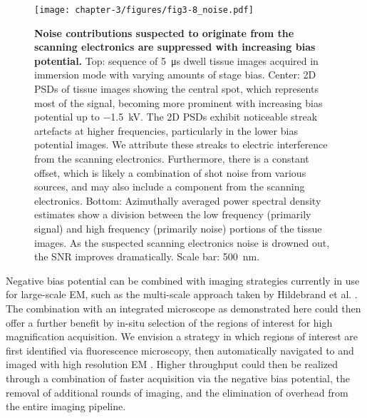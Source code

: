 \begin{figure}[!tbh]
    \centering
    \texttt{[image: chapter-3/figures/fig3-8\_noise.pdf]}
    \caption{\textbf{Noise contributions suspected to originate from the scanning electronics are suppressed with increasing bias potential.}
    Top: sequence of \SI{5}{\micro\second} dwell tissue images acquired in immersion mode with varying amounts of stage bias. Center: 2D PSDs of tissue images showing the central spot, which represents most of the signal, becoming more prominent with increasing bias potential up to \SI{-1.5}{\kilo\volt}. The 2D PSDs exhibit noticeable streak artefacts at higher frequencies, particularly in the lower bias potential images. We attribute these streaks to electric interference from the scanning electronics. Furthermore, there is a constant offset, which is likely a combination of shot noise from various sources, and may also include a component from the scanning electronics. Bottom: Azimuthally averaged power spectral density estimates show a division between the low frequency (primarily signal) and high frequency (primarily noise) portions of the tissue images. As the suspected scanning electronics noise is drowned out, the SNR improves dramatically. Scale bar: \SI{500}{\nano\meter}.}
    \label{fig:3.8_noise}
\end{figure}

Negative bias potential can be combined with imaging strategies currently in use for large-scale EM, such as the multi-scale approach taken by Hildebrand et al. \cite{hildebrand2017whole}. The combination with an integrated microscope as demonstrated here could then offer a further benefit by in-situ selection of the regions of interest for high magnification acquisition. We envision a strategy in which regions of interest are first identified via fluorescence microscopy, then automatically navigated to and imaged with high resolution EM \cite{koning2019integrated}. Higher throughput could then be realized through a combination of faster acquisition via the negative bias potential, the removal of additional rounds of imaging, and the elimination of overhead from the entire imaging pipeline.

